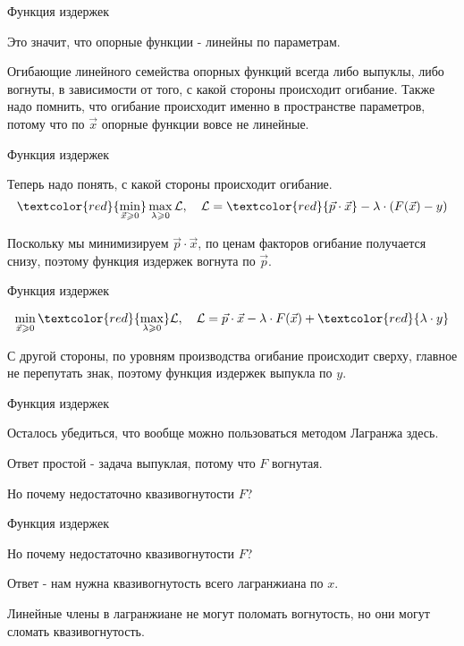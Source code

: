 \documentclass{beamer}
\begin{document}
\begin{frame}{Функция издержек}

Это значит, что опорные функции - линейны по параметрам.

Огибающие линейного семейства опорных функций всегда либо выпуклы, либо вогнуты, в зависимости от того, с какой стороны происходит огибание. Также надо помнить, что огибание происходит именно в пространстве параметров, потому что по $\vec x$ опорные функции вовсе не линейные. 

\end{frame}

\begin{frame}{Функция издержек}

Теперь надо понять, с какой стороны происходит огибание.
$$ \textcolor{red}{\min_{\vec x \geqslant 0}} \max_{\lambda \geqslant 0} \mathcal{L}, \quad \mathcal{L} = \textcolor{red}{\vec p \cdot \vec x} - \lambda \cdot (F(\vec x) - y)$$

Поскольку мы минимизируем $\vec p \cdot \vec x$, по ценам факторов огибание получается снизу, поэтому функция издержек вогнута по $\vec p$.

\end{frame}

\begin{frame}{Функция издержек}

$$ \min_{\vec x \geqslant 0} \textcolor{red}{\max_{\lambda \geqslant 0}}  \mathcal{L}, \quad \mathcal{L} = \vec p \cdot \vec x - \lambda \cdot F(\vec x) + \textcolor{red}{\lambda \cdot y}$$

С другой стороны, по уровням производства огибание происходит сверху, главное не перепутать знак, поэтому функция издержек выпукла по $y$.

\end{frame}

\begin{frame}{Функция издержек}

Осталось убедиться, что вообще можно пользоваться методом Лагранжа здесь. 

Ответ простой - \alert{задача выпуклая, потому что $F$ вогнутая.} 

Но почему недостаточно квазивогнутости $F$? 

\end{frame}

\begin{frame}{Функция издержек}

Но почему недостаточно квазивогнутости $F$? 

Ответ - нам нужна квазивогнутость всего лагранжиана по $x$.

Линейные члены в лагранжиане не могут поломать вогнутость, но они могут сломать квазивогнутость.

\end{frame}
\end{document}
